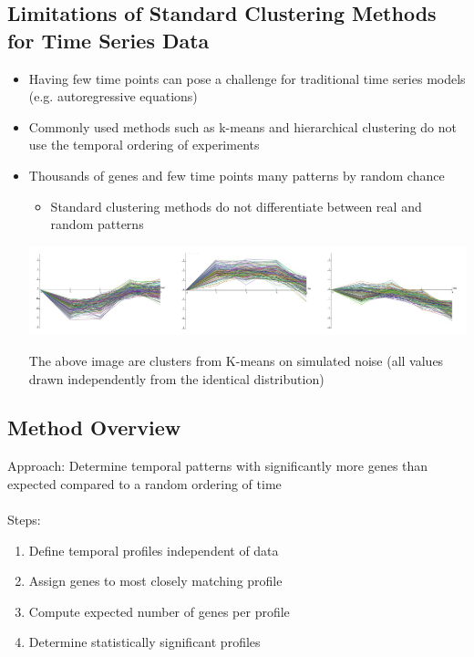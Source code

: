 \documentclass[10pt]{article}
\begin{document}
\subsection*{Limitations of Standard Clustering Methods for Time Series Data}
\begin{itemize}
    \item Having few time points can pose a challenge for traditional time
    series models (e.g. autoregressive equations) 
    \item Commonly used methods such as k-means and hierarchical clustering do not use the temporal ordering of experiments
    \item Thousands of genes and few time points many patterns by random chance
    \begin{itemize}
        \item Standard clustering methods do not differentiate between real and random patterns
    \end{itemize}
    \begin{center}
        \includegraphics*[width=\textwidth]{W6_41.png}
    \end{center}
    The above image are clusters from K-means on simulated noise (all values drawn independently from the identical distribution)
\end{itemize}

\subsection*{Method Overview}
Approach: Determine temporal patterns with significantly more genes than expected compared to a random ordering of time\\\\
Steps:
\begin{enumerate}
    \item Define temporal profiles independent of data
    \item Assign genes to most closely matching profile
    \item Compute expected number of genes per profile
    \item Determine statistically significant profiles
\end{enumerate}
\end{document}
